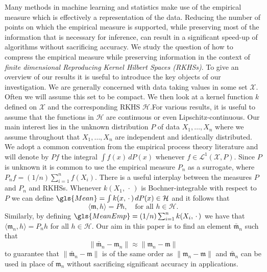 \documentclass[10pt]{amsart}
\theoremstyle{definition}\newtheorem{defi}[theo]{Definition}\newtheorem{rema}[theo]{Remark}\newtheorem{exam}[theo]{Example}\newtheorem{exem}[theo]{Example}\newtheorem{nota}[theo]{Notation}
\theoremstyle{remark}
\newcommand{\X}{\mathcal{X}}
\newcommand{\cH}{\mathcal{H}}
\newcommand{\clL}{\mathcal{L}}
\newcommand{\mean}{\mathfrak{m}}
\begin{document}
Many methods in machine learning and statistics make use of the empirical measure which is effectively a representation of the data. Reducing the number of points on which the empirical measure is supported, while preserving most of the information that is necessary for inference, can result in a significant speed-up of algorithms without sacrificing accuracy. We study the question of how to compress the empirical measure while preserving information in the context of \emph{finite dimensional Reproducing Kernel Hilbert Spaces (RKHSs)}. To give an overview of our results it is useful to introduce the key objects of our investigation. We are generally concerned with data taking values in some set $\X$. Often we will assume this set to be compact. We then look at a kernel function $k$ defined on $\X$ and the corresponding RKHS $\cH$.\linebreak For various results, it is useful to assume that the functions in $\cH$ are continuous or even Lipschitz-continuous. Our main interest lies in the unknown distribution $P$ of data $X_1,\dots, X_n$ where we assume throughout that $X_1,\dots,X_n$ are independent and identically distributed. We adopt a common convention from the empirical process theory literature and will denote by $Pf$ the integral $\int f(x) \,dP(x)$ whenever $f \in \clL^1(\X,P)$. Since $P$ is unknown it is common to use the empirical measure $P_n$ as a surrogate, where $P_n f = (1/n) \sum_{i=1}^n f(X_i)$. There is a useful interplay between the measures $P$ and $P_n$ and RKHSs. Whenever $k(X_1,\,\cdot\,)$ is Bochner-integrable with respect to $P$ we can define $\gls{Mean} = \int k(x,\,\cdot\,) \, dP(x) \in \cH$ and it follows that
\[
\langle \mean,h \rangle = Ph, \quad\text{for all } h \in \cH.
\]
Similarly, by defining $\gls{MeanEmp} = (1/n) \sum_{i=1}^n k(X_i,\,\cdot\,)$ we have that $\langle \mean_n,h \rangle = P_n h$ for all $h\in \cH$. Our aim in this paper is to find an element $\bar{\mean}_n$ such that
\[
\| \bar{\mean}_n - \mean_n \| \approx \| \mean_n - \mean\|
\]
to guarantee that $\| \bar{\mean}_n - \mean \|$ is of the same order as $\|\mean_n - \mean\|$ and $\bar{\mean}_n$ can be used in place of $\mean_n$ without sacrificing significant accuracy in applications.
\end{document}
